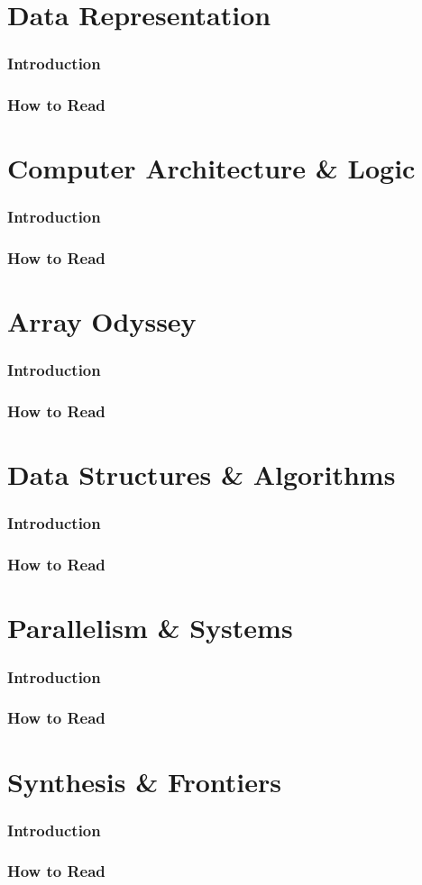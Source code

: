 \documentclass[12pt, oneside, openany]{book}
\begin{document}
\part{Data Representation}
\section*{Introduction}
\section*{How to Read}
\part{Computer Architecture \& Logic}
\section*{Introduction}
\section*{How to Read}
\part{Array Odyssey}
\section*{Introduction}
\section*{How to Read}
\part{Data Structures \& Algorithms}
\section*{Introduction}
\section*{How to Read}
\part{Parallelism \& Systems}
\section*{Introduction}
\section*{How to Read}
\part{Synthesis \& Frontiers}
\section*{Introduction}
\section*{How to Read}
\end{document}
